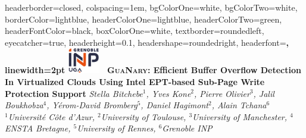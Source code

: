 \documentclass[landscape,a0paper,fontscale=0.3]{baposter} %
\begin{document}
\begin{poster}
{
headerborder=closed, %
colspacing=1em, %
bgColorOne=white, %
bgColorTwo=white, %
borderColor=lightblue, %
headerColorOne=lightblue, %
headerColorTwo=green, %
headerFontColor=black, %
boxColorOne=white, %
textborder=roundedleft, %
eyecatcher=true, %
headerheight=0.1\textheight, %
headershape=roundedright, %
headerfont=\Large\bf\textsc, %
linewidth=2pt %
}
%
{
    \includegraphics[height=3em]{figures/logo_grenoble}    
} %
%
{
    \bf\large\ \textsc{GuaNary}: Efficient Buffer Overflow Detection In Virtualized Clouds Using Intel EPT-based Sub-Page Write Protection Support\vspace{0.3em}
} %
{
    \textsl{\small Stella Bitchebe$^{1}$, Yves Kone$^{2}$, Pierre Olivier$^{3}$, Jalil Boukhobza$^{4}$, Yérom-David Bromberg$^{5}$, Daniel Hagimont$^{2}$, Alain Tchana$^{6}$\\
    $^1$Université Côte d'Azur, $^2$University of Toulouse, $^3$University of Manchester, $^4$ENSTA Bretagne, $^5$University of Rennes, $^6$Grenoble INP}\\ 
    \vspace{0.15em} 
}
\end{poster}
\end{document}
